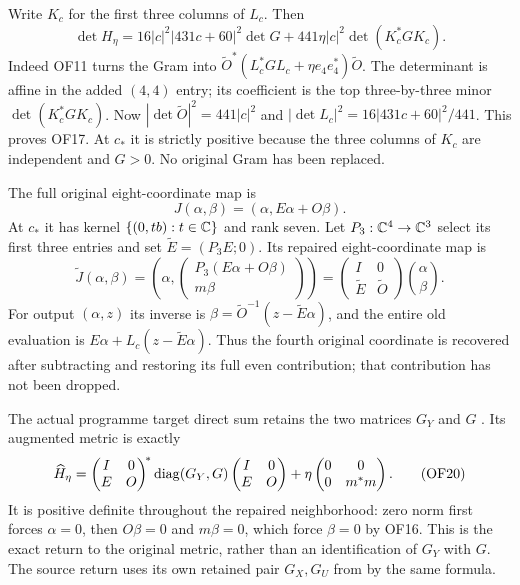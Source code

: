 Write $K_c$ for the first three columns of $L_c$. Then
\begin{equation}
 \det H_\eta=16|c|^2|431c+60|^2\det G
       +441\eta|c|^2\det(K_c^*GK_c).\tag{OF17}
\end{equation}
Indeed OF11 turns the Gram into
$\widetilde O^*(L_c^*GL_c+\eta e_4e_4^*)\widetilde O$.
The determinant is affine in the added $(4,4)$ entry; its
coefficient is the top three-by-three minor $\det(K_c^*GK_c)$.
Now $|\det\widetilde O|^2=441|c|^2$ and
$|\det L_c|^2=16|431c+60|^2/441$. This proves OF17.
At $c_*$ it is strictly positive because the three columns of $K_c$
are independent and $G>0$. No original Gram has been replaced.

The full original eight-coordinate map is
\begin{equation}
 J(\alpha,\beta)=(\alpha,E\alpha+O\beta).
 \tag{OF18}
\end{equation}
At $c_*$ it has kernel $\{(0,tb):t\in\mathbb C\}$ and rank seven.
Let $P_3:\mathbb C^4\to\mathbb C^3$ select its first three entries and set
$\widetilde E=(P_3E;0)$. Its repaired eight-coordinate map is
\begin{equation}
 \widetilde J(\alpha,\beta)
 =\left(\alpha,\begin{pmatrix}P_3(E\alpha+O\beta)\\m\beta\end{pmatrix}\right)
 =\begin{pmatrix}I&0\\\widetilde E&\widetilde O\end{pmatrix}
   \binom\alpha\beta.\tag{OF19}
\end{equation}
For output $(\alpha,z)$ its inverse is
$\beta=\widetilde O^{-1}(z-\widetilde E\alpha)$, and the entire
old evaluation is $E\alpha+L_c(z-\widetilde E\alpha)$.
Thus the fourth original coordinate is recovered after subtracting
and restoring its full even contribution; that contribution has
not been dropped.

The actual programme target direct sum retains the two matrices
$G_Y$ and $G$ \cite[RW14]{sfrepair:Fable}. Its augmented metric is exactly
\begin{equation}
 \widehat H_\eta=
 \begin{pmatrix}I&0\\E&O\end{pmatrix}^{\!*}
 \operatorname{diag}(G_Y,G)
 \begin{pmatrix}I&0\\E&O\end{pmatrix}
 +\eta\begin{pmatrix}0&0\\0&m^*m\end{pmatrix}.
 \tag{OF20}
\end{equation}
It is positive definite throughout the repaired neighborhood:
zero norm first forces $\alpha=0$, then $O\beta=0$ and
$m\beta=0$, which force $\beta=0$ by OF16. This is the exact
return to the original metric, rather than an identification of
$G_Y$ with $G$. The source return uses its own retained pair
$G_X,G_U$ from \cite[RW19]{sfrepair:Fable} by the same formula.

